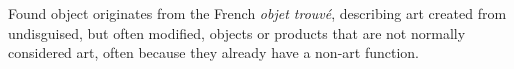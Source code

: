 



%
%
Found object originates from the French \textit{objet trouvé}, describing art created from undisguised, but often modified, objects or products that are not normally considered art, often because they already have a non-art function.








